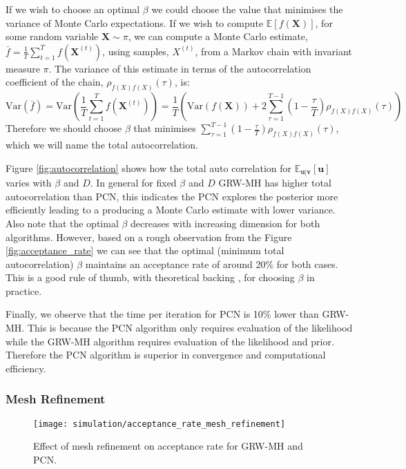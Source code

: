 \documentclass[11pt]{article}
\begin{document}
If we wish to choose an optimal $\beta$ we could choose the value that minimises the variance of Monte Carlo expectations. If we wish to compute $\mathbb{E}[f(\boldsymbol{X})]$, for some random variable $\boldsymbol{X} \sim \pi$, we can compute a Monte Carlo estimate, $\bar{f} = \frac{1}{T} \sum_{t=1}^{T} f(\boldsymbol{X}^{(t)})$, using samples, $X^{(t)}$, from a Markov chain with invariant measure $\pi$. The variance of this estimate in terms of the autocorrelation coefficient of the chain, $\rho_{f(X)f(X)}(\tau)$, is:
\begin{equation}
    \text{Var}(\bar{f}) = \text{Var}(\frac{1}{T} \sum_{t=1}^{T} f(\boldsymbol{X}^{(t)})) = \frac{1}{T} \left(\text{Var}(f(\boldsymbol{X})) + 2 \sum_{\tau=1}^{T-1} (1-\frac{\tau}{T}) \rho_{f(X)f(X)}(\tau)\right)
\end{equation}
Therefore we should choose $\beta$ that minimises $\sum_{\tau=1}^{T-1} (1-\frac{\tau}{T}) \rho_{f(X)f(X)}(\tau)$, which we will name the total autocorrelation.

Figure \ref{fig:autocorrelation} shows how the total auto correlation for $\mathbb{E}_{\boldsymbol{u}|\boldsymbol{v}}[\boldsymbol{u}]$ varies with $\beta$ and $D$. In general for fixed $\beta$ and $D$ GRW-MH has higher total autocorrelation than PCN, this indicates the PCN explores the posterior more efficiently leading to a producing a Monte Carlo estimate with lower variance. Also note that the optimal $\beta$ decreases with increasing dimension for both algorithms. However, based on a rough observation from the Figure \ref{fig:acceptance_rate} we can see that the optimal (minimum total autocorrelation) $\beta$ maintains an acceptance rate of around 20\% for both cases. This is a good rule of thumb, with theoretical backing \cite{sherlock}, for choosing $\beta$ in practice.

Finally, we observe that the time per iteration for PCN is 10\% lower than GRW-MH. This is because the PCN algorithm only requires evaluation of the likelihood while the GRW-MH algorithm requires evaluation of the likelihood and prior. Therefore the PCN algorithm is superior in convergence and computational efficiency.

\subsubsection{Mesh Refinement}
\begin{figure}
    \centering
    \texttt{[image: simulation/acceptance\_rate\_mesh\_refinement]}
    \caption{Effect of mesh refinement on acceptance rate for GRW-MH and PCN.}
    \label{fig:mesh_refinement}
\end{figure}
\end{document}
